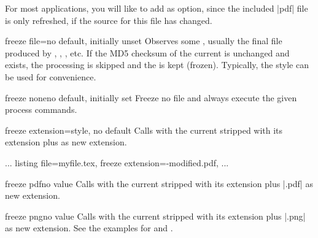 \clearpage

\begin{marker}
  For most applications, you will like to add  as option,
  since the included |pdf| file is only refreshed, if the source for this file
  has changed.
\end{marker}

\begin{docTcbKey}[][doc new=2016-07-14]{freeze file}{=}{no default, initially unset}
  Observes some , usually the final file produced by ,
  , , etc.
  If the MD5 checksum of the current  is unchanged
  and  exists, the processing is skipped and
  the  is kept (frozen).
  Typically, the style  can be used for
  convenience.
\end{docTcbKey}

\begin{docTcbKey}[][doc new=2016-07-14]{freeze none}{}{no default, initially set}
  Freeze no file and always execute the given process commands.
\end{docTcbKey}

\begin{docTcbKey}[][doc new=2016-07-14]{freeze extension}{=}{style, no default}
  Calls  with the current 
  stripped with its extension plus  as new extension.
\begin{dispListing}
  ...
  listing file=myfile.tex,
  freeze extension=-modified.pdf,    %
  ...
\end{dispListing}
\end{docTcbKey}

\begin{docTcbKey}[][doc new=2016-07-14]{freeze pdf}{}{no value}
  Calls  with the current 
  stripped with its extension plus |.pdf| as new extension.
\end{docTcbKey}

\begin{docTcbKey}[][doc new=2016-07-14]{freeze png}{}{no value}
  Calls  with the current 
  stripped with its extension plus |.png| as new extension.
  See the examples for  and .
\end{docTcbKey}

